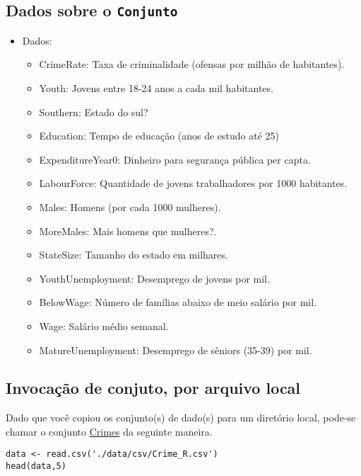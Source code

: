 \documentclass[12pt]{abntex2}
\begin{document}
\subsection{Dados sobre o \texttt{Conjunto}}
\label{sec:orga7c524d}
\begin{itemize}
\item Dados:
\begin{itemize}
\item CrimeRate: Taxa de criminalidade (ofensas por milhão de habitantes).
\item Youth: Jovens entre 18-24 anos a cada mil habitantes.
\item Southern: Estado do sul?
\item Education: Tempo de educação (anos de estudo até 25)
\item ExpenditureYear0: Dinheiro para segurança pública per capta.
\item LabourForce: Quantidade de jovens trabalhadores por 1000 habitantes.
\item Males: Homens (por cada 1000 mulheres).
\item MoreMales: Mais homens que mulheres?.
\item StateSize: Tamanho do estado em milhares.
\item YouthUnemployment: Desemprego de jovens por mil.
\item BelowWage: Número de famílias abaixo de meio salário por mil.
\item Wage: Salário médio semanal.
\item MatureUnemployment: Desemprego de sêniors (35-39) por mil.
\end{itemize}
\end{itemize}

\subsection{Invocação de conjuto, por arquivo local}
\label{sec:org442b85f}

Dado que você copiou os conjunto(s) de dado(s) para um diretório
local, pode-se chamar o conjunto \href{https://drive.google.com/file/d/1hZpHoEXbhZGvmtmrbcWpXYfBV-2ZD7uF/view?usp=sharing}{Crimes} da seguinte maneira.

\begin{verbatim}
data <- read.csv('./data/csv/Crime_R.csv')
head(data,5)
\end{verbatim}
\end{document}

